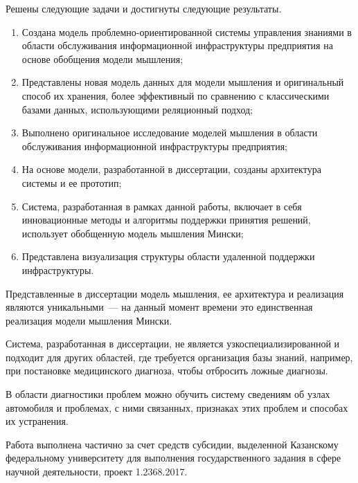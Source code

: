 
Решены следующие задачи и достигнуты следующие результаты.
\begin{enumerate}
  \item Создана модель проблемно-ориентированной системы управления знаниями в области обслуживания информационной инфраструктуры предприятия на основе обобщения модели мышления;
  \item Представлены новая модель данных для модели мышления и оригинальный способ их хранения, более эффективный по сравнению с классическими базами данных, использующими реляционный подход;
  \item Выполнено оригинальное исследование моделей мышления в области обслуживания информационной инфраструктуры предприятия;
  \item На основе модели, разработанной в диссертации, созданы архитектура системы и ее прототип; 
  \item Система, разработанная в рамках данной работы, включает в себя инновационные методы и алгоритмы поддержки принятия решений, использует обобщенную модель мышления Мински;
  \item Представлена визуализация структуры области удаленной поддержки инфраструктуры.
\end{enumerate}

Представленные в диссертации модель мышления, ее архитектура и реализация являются уникальными~--- на данный момент времени это единственная реализация модели мышления Мински. \par
Система, разработанная в диссертации, не является узкоспециализированной и подходит для других областей, где требуется организация базы знаний, например, при постановке медицинского диагноза, чтобы отбросить ложные диагнозы. \par
В области диагностики проблем можно обучить систему сведениям об узлах автомобиля и проблемах, с ними связанных, признаках этих проблем и способах их устранения. \par
Работа выполнена  частично за счет средств субсидии, выделенной Казанскому федеральному университету для выполнения государственного задания в сфере научной деятельности, проект   1.2368.2017.





